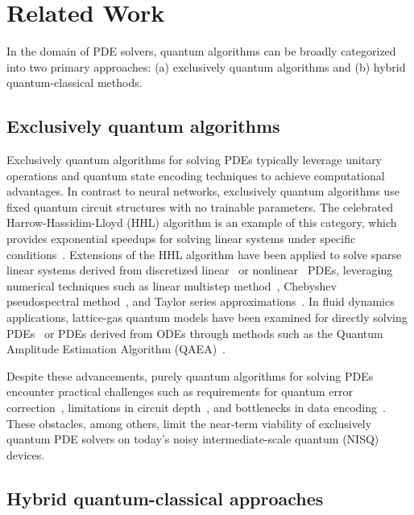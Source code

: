 \section{Related Work}

In the domain of PDE solvers, quantum algorithms can be broadly categorized into two primary approaches: (a) exclusively quantum algorithms and (b) hybrid quantum-classical methods. 

\subsection{Exclusively quantum algorithms}

Exclusively quantum algorithms for solving PDEs typically leverage unitary operations and quantum state encoding techniques to achieve computational advantages. In contrast to neural networks, exclusively quantum algorithms use fixed quantum circuit structures with no trainable parameters.
The celebrated Harrow-Hassidim-Lloyd (HHL) algorithm is an example of this category, which provides exponential speedups for solving linear systems under specific conditions~\cite{harrow2009quantum}. Extensions of the HHL algorithm have been applied to solve sparse linear systems derived from discretized linear~\cite{ambainis2012variable, somma2016quantum} or nonlinear~\cite{leyton2008quantum} PDEs, leveraging numerical techniques such as linear multistep method~\cite{berry2014high}, Chebyshev pseudospectral method~\cite{childs2020quantum}, and Taylor series approximations~\cite{berry2017quantum}. In fluid dynamics applications, lattice-gas quantum models have been examined for directly solving PDEs~\cite{yepez2002quantum,montanaro2016quantum} or PDEs derived from ODEs through methods such as the Quantum Amplitude Estimation Algorithm (QAEA)~\cite{oz2022solving,oz2023efficient}.

Despite these advancements, purely quantum algorithms for solving PDEs encounter practical challenges such as requirements for quantum error correction~\cite{preskill1998reliable, terhal2015quantum, childs2021theory}, 
limitations in circuit depth~\cite{bravyi2005universal, montanaro2016quantum, boixo2018characterizing}, and bottlenecks in data encoding~\cite{aaronson2015read, ciliberto2018quantum, lloyd2013quantum}. These obstacles, among others, limit the near-term viability of exclusively quantum PDE solvers on today's noisy intermediate-scale quantum (NISQ) devices.

\subsection{Hybrid quantum-classical approaches} 

